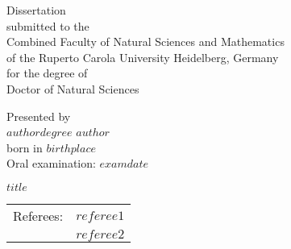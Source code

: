 \documentclass[11pt, a4paper, twosided]{book}
\newcommand{\thesisauthor}{$author$}
\newcommand{\thesisdate}{$date$}
\begin{document}

\thispagestyle{empty}
  \begin{center}
  {\Large{Dissertation\\
    submitted to the\\
    Combined Faculty of Natural Sciences and Mathematics\\
    of the Ruperto Carola University Heidelberg, Germany\\
    for the degree of\\
    Doctor of Natural Sciences\\}} \vspace*{\fill}

  \Large{Presented by} \\\vspace{0.5cm}
  \Large{$authordegree$ $author$} \\
  \Large{born in $birthplace$} \\
  \Large{Oral examination: $examdate$}

\end{center}
\newpage\null\thispagestyle{empty}\newpage


\pagebreak
\thispagestyle{empty}
\null
\begin{center}
\Large{$title$} \\
\vspace*{\fill}
\begin{tabular}{ c c }
Referees: & $referee1$ \\
          & $referee2$
\end{tabular}
\end{center}
\newpage\null\thispagestyle{empty}\newpage


\newpage
\thispagestyle{empty}
%
%
%
%
\end{document}
